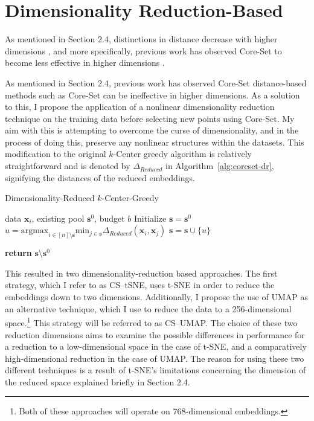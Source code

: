\documentclass[english,bachelor,ul]{webisthesis} %
\begin{document}
\section{Dimensionality Reduction-Based}

As mentioned in Section 2.4, distinctions in distance decrease with higher dimensions \citep{DBLP:conf/icdt/BeyerGRS99}, and more specifically, previous work has observed Core-Set to become less effective in higher dimensions \citep{DBLP:conf/iccv/SinhaED19}.

As mentioned in Section 2.4, previous work has observed Core-Set distance-based methods such as Core-Set can be ineffective in higher dimensions. As a solution to this, I propose the application of a nonlinear dimensionality reduction technique on the training data before selecting new points using Core-Set. My aim with this is attempting to overcome the curse of dimensionality, and in the process of doing this, preserve any nonlinear structures within the datasets. This modification to the original $k$-Center greedy algorithm is relatively straightforward and is denoted by $ \Delta_{Reduced} $ in Algorithm~\ref{alg:coreset-dr}, signifying the distances of the reduced embeddings.

\begin{algorithm}[htpb]
\caption{Dimensionality-Reduced $k$-Center-Greedy}%
\label{alg:coreset-dr}
\begin{algorithmic}


\Require data $ \mathbf{x}_i $, existing pool $ \mathbf{s}^0 $, budget $ b $
\State Initialize $ \mathbf{s} = \mathbf{s}^0 $
\Repeat
\State $ u = \text{argmax}_{i \in [n] \setminus \mathbf{s}} \text{min}_{j \in \mathbf{s}} \Delta_{Reduced}(\mathbf{x}_i, \mathbf{x}_j) $
\State $ \mathbf{s} = \mathbf{s} \cup \{u\} $

\State \textbf{return} $\mathbf{s} \setminus \mathbf{s}^0 $
\end{algorithmic}
\end{algorithm}

This resulted in two dimensionality-reduction based approaches. The first strategy, which I refer to as CS--tSNE, uses t-SNE in order to reduce the embeddings down to two dimensions. Additionally, I propose the use of UMAP as an alternative technique, which I use to reduce the data to a 256-dimensional space.\footnote{Both of these approaches will operate on 768-dimensional embeddings.} This strategy will be referred to as CS--UMAP. The choice of these two reduction dimensions aims to examine the possible differences in performance for a reduction to a low-dimensional space in the case of t-SNE, and a comparatively high-dimensional reduction in the case of UMAP. The reason for using these two different techniques is a result of t-SNE's limitations concerning the dimension of the reduced space explained briefly in Section 2.4.
\end{document}
